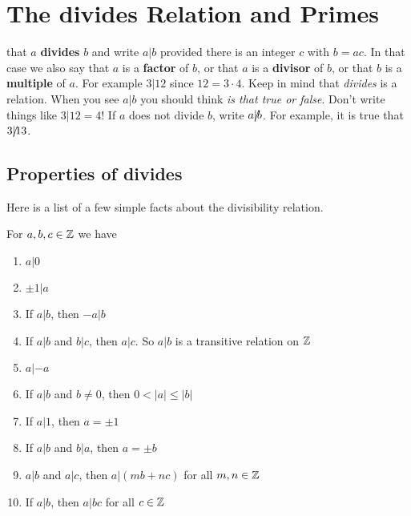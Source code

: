 \newcommand{\notdivides}{{\mathrm{/}\mkern-9.0mu{|}}} %
\chapter{The \textsf{divides} Relation and Primes}

 that $a$ {\bfseries divides} $b$ and write $a|b$ provided%
there is an integer $c$ with $b=ac$.
 In that case we also say that 
$a$ is a {\bfseries factor} of $b$, or that $a$ is a {\bfseries divisor}
of $b$, or 
 that $b$ is a {\bfseries multiple} of $a$.  For example $3|12$ since 
$12 = 3\cdot 4$. Keep in mind that
{\itshape divides} is  a relation. When you see $a|b$ you should think 
{\itshape is that true or false}. Don't write things like $3|12 = 4$!
If $a$ does not divide $b$,  write $a \notdivides b$.
 For example, it is true%
that $3 \notdivides{13}$.
 

\section{Properties of \textsf{divides}}
Here is a list of a few simple facts about the divisibility relation. 
\begin{thm}
For $a,b,c\in \mathbb{Z}$ we have
\begin{enumerate}
  \item $a|0$
  
  \item $\pm 1|a$ 
  
  \item If $a|b$, then $-a|b$
  
  \item If $a|b$ and $b|c$, then $a|c$. 
  So $a|b$ is a transitive relation on $\mathbb{Z}$
  
  \item $a|-a$
  
  \item If $a|b$ and $b\not=0$, then $0<|a|\leq |b|$
  
  \item If $a|1$, then $a=\pm 1$
  
  \item If $a|b$ and $b|a$, then $a=\pm b$
  
  \item $a|b$ and $a|c$, then $a|(mb+nc)$ for all $m,n\in \mathbb{Z}$
  
  \item If $a|b$, then $a|bc$ for all $c\in \mathbb{Z}$
\end{enumerate}
\end{thm} 


